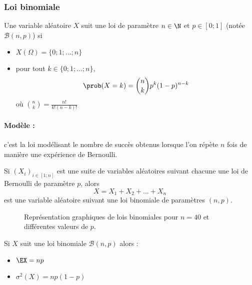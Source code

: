 \subsubsection{Loi binomiale}
\begin{definition}{}{}
	Une variable aléatoire $X$ suit une loi  de paramètre $n \in \N$ et $p \in [0;1]$ (notée $\mathscr{B}(n,p)$) si 
	\begin{itemize}
		\item $X(\Omega)=\{0;1;...;n\}$ 
		\item pour tout $k \in \{0;1;...;n\}$,  $$\prob(X=k)=\binom{n}{k} p^k (1-p)^{n-k}$$
		où $\binom{n}{k} = \frac{n!}{k!(n-k)!}$
	\end{itemize}
\end{definition}

\paragraph{Modèle :} c'est la loi modélisant le nombre de succès obtenus lorsque l'on répète $n$ fois de manière  une expérience de Bernoulli.

\begin{proposition}{}{}
	Si $(X_i)_{i \in [1;n]}$ est une suite de variables aléatoires  suivant chacune une loi de Bernoulli de paramètre $p$, alors 
	$$X=X_1+X_2+...+X_n$$
	est une variable aléatoire suivant une loi binomiale de paramètres $(n,p)$.
\end{proposition}

\begin{figure}
	\centering
	\caption{Représentation graphiques de lois binomiales pour $n=40$ et différentes valeurs de $p$.}
\end{figure}

\begin{proposition}{}{}
	Si $X$ suit une loi binomiale $\mathscr{B}(n,p)$ alors :
	\begin{itemize}
		\item $\EX = np$
		\item $\sigma^2(X)=np(1-p)$
	\end{itemize}
\end{proposition}

